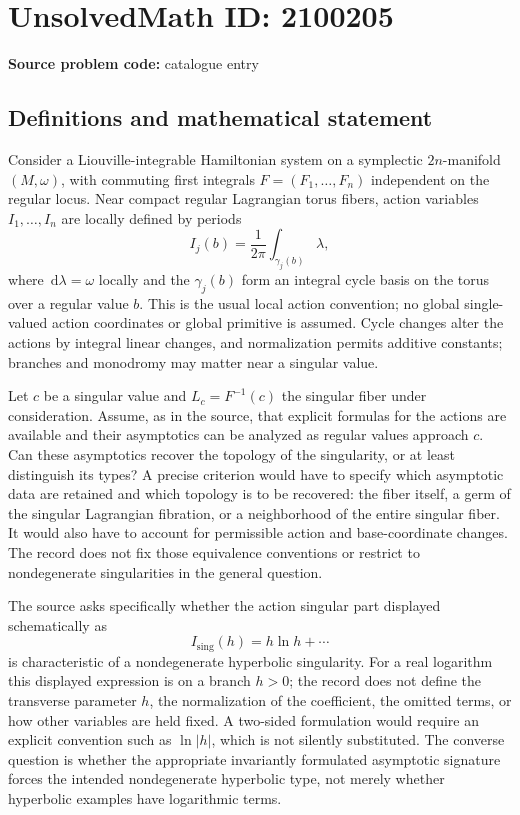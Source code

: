 \documentclass[11pt]{article}
\newcommand{\dd}{\,\mathrm{d}}
\begin{document}
\section*{UnsolvedMath ID: 2100205}
\textbf{Source problem code:} catalogue entry
\subsection{Definitions and mathematical statement}
Consider a Liouville-integrable Hamiltonian system on a symplectic $2n$-manifold $(M,\omega)$, with commuting first integrals $F=(F_1,\ldots,F_n)$ independent on the regular locus. Near compact regular Lagrangian torus fibers, action variables $I_1,\ldots,I_n$ are locally defined by periods
\[
I_j(b)=\frac{1}{2\pi}\int_{\gamma_j(b)}\lambda,
\]
where $\dd\lambda=\omega$ locally and the $\gamma_j(b)$ form an integral cycle basis on the torus over a regular value $b$. This is the usual local action convention; no global single-valued action coordinates or global primitive is assumed. Cycle changes alter the actions by integral linear changes, and normalization permits additive constants; branches and monodromy may matter near a singular value.

Let $c$ be a singular value and $L_c=F^{-1}(c)$ the singular fiber under consideration. Assume, as in the source, that explicit formulas for the actions are available and their asymptotics can be analyzed as regular values approach $c$. Can these asymptotics recover the topology of the singularity, or at least distinguish its types? A precise criterion would have to specify which asymptotic data are retained and which topology is to be recovered: the fiber itself, a germ of the singular Lagrangian fibration, or a neighborhood of the entire singular fiber. It would also have to account for permissible action and base-coordinate changes. The record does not fix those equivalence conventions or restrict to nondegenerate singularities in the general question.

The source asks specifically whether the action singular part displayed schematically as
\[
I_{\mathrm{sing}}(h)=h\ln h+\cdots
\]
is characteristic of a nondegenerate hyperbolic singularity. For a real logarithm this displayed expression is on a branch $h>0$; the record does not define the transverse parameter $h$, the normalization of the coefficient, the omitted terms, or how other variables are held fixed. A two-sided formulation would require an explicit convention such as $\ln|h|$, which is not silently substituted. The converse question is whether the appropriate invariantly formulated asymptotic signature forces the intended nondegenerate hyperbolic type, not merely whether hyperbolic examples have logarithmic terms.
\end{document}
